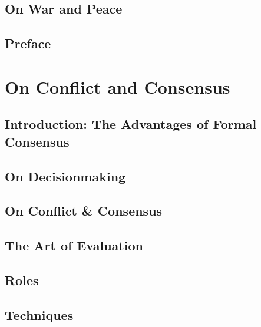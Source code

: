 \documentclass[12pt,nottoc]{book}
\begin{document}
\chapter*{On War and Peace}



{\small
\tableofcontents
\listoffigures

}

\chapter*{Preface}
{\small


}

\mainmatter
\pagestyle{headings}
\part{On Conflict and Consensus}

\chapter[Introduction]{Introduction: The Advantages of Formal
  Consensus}


\chapter{On Decisionmaking}


\chapter{On Conflict \& Consensus}


\chapter{The Art of Evaluation}


\chapter{Roles}


\chapter{Techniques}

\end{document}
